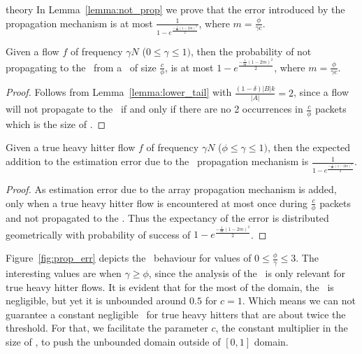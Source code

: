 \begin{maybeappendix}{theory}
In Lemma~\ref{lemma:not_prop} we prove that the error introduced by the propagation mechanism is at most $\frac{1}{1-e^{\frac{-\frac{1}{m}(1-2m)^2}{2}}}$, where $m=\frac{\phi}{\gamma c}$.

\begin{lemma}
\label{lemma:not_prop}
Given a flow $f$ of frequency $\gamma N$ ($0\leq \gamma \leq 1)$, then the probability of not propagating to the \cs\ from a \sfa\ of size $\frac{c}{\phi}$, is at most ${1-e^{\frac{-\frac{1}{m}(1-2m)^2}{2}}}$, where $m=\frac{\phi}{\gamma c}$.
\end{lemma}

\begin{proof}
Follows from Lemma~\ref{lemma:lower_tail} with $\frac{(1-\delta)|B|k}{|A|}=2$, since a flow will not propagate to the \cs\ if and only if there are no 2 occurrences in $\frac{c}{\phi}$ packets which is the size of \sfa.
\end{proof}

\begin{lemma}
\label{lemma:not_prop_geo}
Given a true heavy hitter flow $f$ of frequency $\gamma N$ ($\phi \leq \gamma \leq 1)$, then the expected addition to the estimation error due to the \sfa\ propagation mechanism is $\frac{1}{1-e^{\frac{-\frac{1}{m}(1-2m)^2}{2}}}$.
\end{lemma}

\begin{proof}
As estimation error due to the array propagation mechanism is added, only when a true heavy hitter flow is encountered at most once during $\frac{c}{\phi}$ packets and not propagated to the \cs. Thus the expectancy of the error is distributed geometrically with probability of success of ${1-e^{\frac{-\frac{1}{m}(1-2m)^2}{2}}}$.
\end{proof}

Figure~\ref{fig:prop_err} depicts the \pe\ behaviour for values of $0 \leq \frac{\phi}{\gamma} \leq 3$. The interesting values are when $\gamma \geq \phi$, since the analysis of the \pe\ is only relevant for true heavy hitter flows. It is evident that for the most of the domain, the \pe\ is negligible, but yet it is unbounded around $0.5$ for $c=1$. Which means we can not guarantee a constant negligible \pe\ for true heavy hitters that are about twice the threshold. For that, we facilitate the parameter $c$, the constant multiplier in the size of \sfa, to push the unbounded domain outside of $[0,1]$ domain.


\end{maybeappendix}
